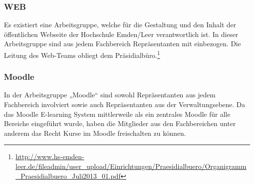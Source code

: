 \subsubsection{WEB}
Es existiert eine Arbeitsgruppe, welche für die Gestaltung und den Inhalt der öffentlichen Webseite der Hochschule Emden/Leer verantwortlich ist. In dieser Arbeitsgruppe sind aus jedem Fachbereich Repräsentanten mit einbezogen. Die Leitung des Web-Teams obliegt dem Präsidialbüro.\footnote{\url{http://www.hs-emden-leer.de/fileadmin/user_upload/Einrichtungen/Praesidialbuero/Organigramm_Praesidialbuero_Juli2013_01.pdf}}

\subsubsection{Moodle}
In der Arbeitsgruppe „Moodle“ sind sowohl Repräsentanten aus jedem Fachbereich involviert sowie auch Repräsentanten aus der Verwaltungsebene. Da das Moodle E-learning System mittlerweile als ein zentrales Moodle für alle Bereiche eingeführt wurde, haben die Mitglieder aus den Fachbereichen unter anderem das Recht Kurse im Moodle freischalten zu können. 
